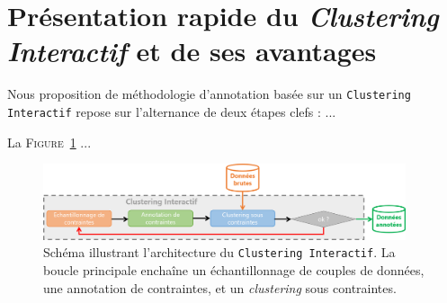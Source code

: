 	\section{Présentation rapide du \textit{Clustering Interactif} et de ses avantages}
		\label{section:5.1-GUIDE-PRESENTATION-RAPIDE}
		
		
		
		Nous proposition de méthodologie d'annotation basée sur un \texttt{Clustering Interactif} repose sur l'alternance de deux étapes clefs : ...
		
		
		\begin{leftBarImportantGreen}
			La \textsc{Figure~\ref{figure:5.1-GUIDE-PRESENTATION-RAPIDE-CLUSTERING-INTERACTIF}} ...
			
			\begin{figure}[H]
				\centering
				\includegraphics[width=0.95\textwidth]{figures/interactive-clustering-architecture-sequentielle}
				\caption{
					Schéma illustrant l'architecture du \texttt{Clustering Interactif}.
					La boucle principale enchaîne un échantillonnage de couples de données, une annotation de contraintes, et un \textit{clustering} sous contraintes.
				}
				\label{figure:5.1-GUIDE-PRESENTATION-RAPIDE-CLUSTERING-INTERACTIF}
			\end{figure}
		\end{leftBarImportantGreen}
	
	
